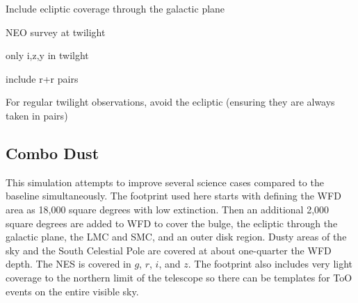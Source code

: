Include ecliptic coverage through the galactic plane

NEO survey at twilight

only i,z,y in twilght

include r+r pairs

For regular twilight observations, avoid the ecliptic (ensuring they are always taken in pairs)

\subsection{Combo Dust}

This simulation attempts to improve several science cases compared to the baseline simultaneously. The footprint used here starts with defining the WFD area as 18,000 square degrees with low extinction. Then an additional 2,000 square degrees are added to WFD to cover the bulge, the ecliptic through the galactic plane, the LMC and SMC, and an outer disk region. Dusty areas of the sky and the South Celestial Pole are covered at about one-quarter the WFD depth. The NES is covered in $g$, $r$, $i$, and $z$. The footprint also includes very light coverage to the northern limit of the telescope so there can be templates for ToO events on the entire visible sky. 



